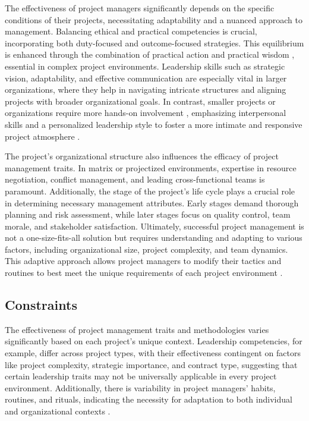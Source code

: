 \documentclass{article}
\begin{document}
The effectiveness of project managers significantly depends on the specific conditions of their projects, necessitating adaptability and a nuanced approach to management. Balancing ethical and practical competencies is crucial, incorporating both duty-focused and outcome-focused strategies. This equilibrium is enhanced through the combination of practical action and practical wisdom \cite{bredillet2015good}, essential in complex project environments. Leadership skills such as strategic vision, adaptability, and effective communication are especially vital in larger organizations, where they help in navigating intricate structures and aligning projects with broader organizational goals. In contrast, smaller projects or organizations require more hands-on involvement \cite{sigurdhssonpatterns}, emphasizing interpersonal skills and a personalized leadership style to foster a more intimate and responsive project atmosphere \cite{pollack2016project}.

The project's organizational structure also influences the efficacy of project management traits. In matrix or projectized environments, expertise in resource negotiation, conflict management, and leading cross-functional teams is paramount. Additionally, the stage of the project's life cycle plays a crucial role in determining necessary management attributes. Early stages demand thorough planning and risk assessment, while later stages focus on quality control, team morale, and stakeholder satisfaction. Ultimately, successful project management is not a one-size-fits-all solution but requires understanding and adapting to various factors, including organizational size, project complexity, and team dynamics. This adaptive approach allows project managers to modify their tactics and routines to best meet the unique requirements of each project environment \cite{hyvari2006success}.

\subsection{Constraints}

The effectiveness of project management traits and methodologies varies significantly based on each project's unique context. Leadership competencies, for example, differ across project types, with their effectiveness contingent on factors like project complexity, strategic importance, and contract type, suggesting that certain leadership traits may not be universally applicable in every project environment\cite{muller2010leadership}. Additionally, there is variability in project managers'  habits, routines, and rituals, indicating the necessity for adaptation to both individual and organizational contexts \cite{sigurdhssonpatterns}.
\end{document}
